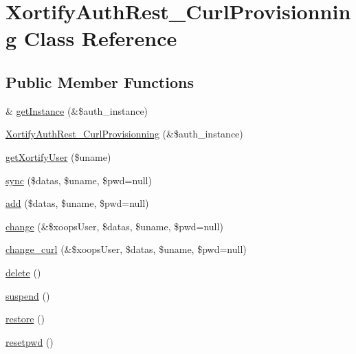 \hypertarget{class_xortify_auth_rest___curl_provisionning}{\section{Xortify\-Auth\-Rest\-\_\-\-Curl\-Provisionning Class Reference}
\label{class_xortify_auth_rest___curl_provisionning}
}
\subsection*{Public Member Functions}
\begin{DoxyCompactItemize}
\item 
\& \hyperlink{class_xortify_auth_rest___curl_provisionning_a2c8eaa915c70d75289ac8a03686194f9}{get\-Instance} (\&\$auth\-\_\-instance)
\item 
\hyperlink{class_xortify_auth_rest___curl_provisionning_a68de3f383b2ad5d695215059fdeed7fa}{Xortify\-Auth\-Rest\-\_\-\-Curl\-Provisionning} (\&\$auth\-\_\-instance)
\item 
\hyperlink{class_xortify_auth_rest___curl_provisionning_a041d726ac26672547ed1504e8e0117aa}{get\-Xortify\-User} (\$uname)
\item 
\hyperlink{class_xortify_auth_rest___curl_provisionning_a35dc08b0f2138eb818ff95345b73bcff}{sync} (\$datas, \$uname, \$pwd=null)
\item 
\hyperlink{class_xortify_auth_rest___curl_provisionning_adfc9fcef01e7bd7b2f47e8e79d51fc63}{add} (\$datas, \$uname, \$pwd=null)
\item 
\hyperlink{class_xortify_auth_rest___curl_provisionning_ae1f0971b9712c794620cf309164e43af}{change} (\&\$xoops\-User, \$datas, \$uname, \$pwd=null)
\item 
\hyperlink{class_xortify_auth_rest___curl_provisionning_aba6f598c234d191a3b3934f90b35fd9f}{change\-\_\-curl} (\&\$xoops\-User, \$datas, \$uname, \$pwd=null)
\item 
\hyperlink{class_xortify_auth_rest___curl_provisionning_a13bdffdd926f26b825ea57066334ff01}{delete} ()
\item 
\hyperlink{class_xortify_auth_rest___curl_provisionning_ad73006a505121228f3b075c2409787d2}{suspend} ()
\item 
\hyperlink{class_xortify_auth_rest___curl_provisionning_aa1371f22826cf8cde4454c9b467203d0}{restore} ()
\item 
\hyperlink{class_xortify_auth_rest___curl_provisionning_a06d70fbd3a2db390b6f2530c0076628e}{resetpwd} ()
\end{DoxyCompactItemize}
